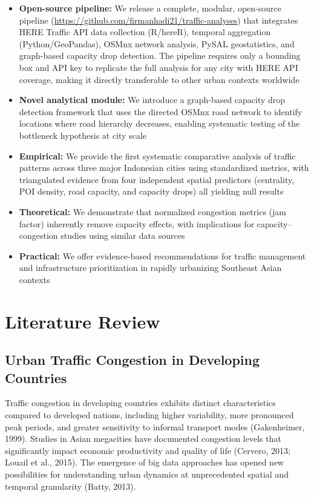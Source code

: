\documentclass[12pt,a4paper]{article}
\begin{document}
\begin{itemize}

\item
  \textbf{Open-source pipeline:} We release a complete, modular, open-source pipeline (\url{https://github.com/firmanhadi21/traffic-analyses}) that integrates HERE Traffic API data collection (R/hereR), temporal aggregation (Python/GeoPandas), OSMnx network analysis, PySAL geostatistics, and graph-based capacity drop detection. The pipeline requires only a bounding box and API key to replicate the full analysis for any city with HERE API coverage, making it directly transferable to other urban contexts worldwide
\item
  \textbf{Novel analytical module:} We introduce a graph-based capacity drop detection framework that uses the directed OSMnx road network to identify locations where road hierarchy decreases, enabling systematic testing of the bottleneck hypothesis at city scale
\item
  \textbf{Empirical:} We provide the first systematic comparative analysis of traffic patterns across three major Indonesian cities using standardized metrics, with triangulated evidence from four independent spatial predictors (centrality, POI density, road capacity, and capacity drops) all yielding null results
\item
  \textbf{Theoretical:} We demonstrate that normalized congestion metrics (jam factor) inherently remove capacity effects, with implications for capacity--congestion studies using similar data sources
\item
  \textbf{Practical:} We offer evidence-based recommendations for traffic management and infrastructure prioritization in rapidly urbanizing Southeast Asian contexts
\end{itemize}



\section{Literature Review}

\subsection{Urban Traffic Congestion in Developing Countries}

Traffic congestion in developing countries exhibits distinct characteristics compared to developed nations, including higher variability, more pronounced peak periods, and greater sensitivity to informal transport modes (Gakenheimer, 1999). Studies in Asian megacities have documented congestion levels that significantly impact economic productivity and quality of life (Cervero, 2013; Louail et al., 2015). The emergence of big data approaches has opened new possibilities for understanding urban dynamics at unprecedented spatial and temporal granularity (Batty, 2013).
\end{document}

